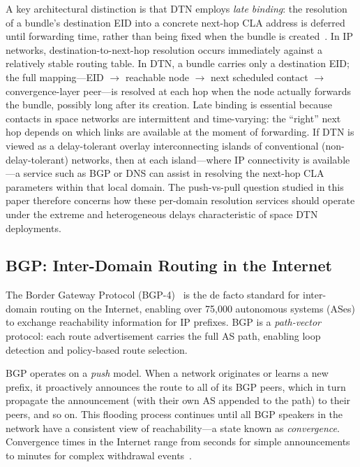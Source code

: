 \documentclass[journal,twocolumn]{IEEEtran}
\begin{document}
A key architectural distinction is that DTN employs \emph{late binding}: the resolution of a bundle's destination EID into a concrete next-hop CLA address is deferred until forwarding time, rather than being fixed when the bundle is created~\cite{fall2003dtn}.
In IP networks, destination-to-next-hop resolution occurs immediately against a relatively stable routing table.
In DTN, a bundle carries only a destination EID; the full mapping---EID $\to$ reachable node $\to$ next scheduled contact $\to$ convergence-layer peer---is resolved at each hop when the node actually forwards the bundle, possibly long after its creation.
Late binding is essential because contacts in space networks are intermittent and time-varying: the ``right'' next hop depends on which links are available at the moment of forwarding.
If DTN is viewed as a delay-tolerant overlay interconnecting islands of conventional (non-delay-tolerant) networks, then at each island---where IP connectivity is available---a service such as BGP or DNS can assist in resolving the next-hop CLA parameters within that local domain.
The push-vs-pull question studied in this paper therefore concerns how these per-domain resolution services should operate under the extreme and heterogeneous delays characteristic of space DTN deployments.

\subsection{BGP: Inter-Domain Routing in the Internet}
\label{sec_bgp_background}

The Border Gateway Protocol (BGP-4)~\cite{rfc4271} is the de facto standard for inter-domain routing on the Internet, enabling over 75{,}000 autonomous systems (ASes) to exchange reachability information for IP prefixes. 
BGP is a \emph{path-vector} protocol: each route advertisement carries the full AS path, enabling loop detection and policy-based route selection.

BGP operates on a \emph{push} model. 
When a network originates or learns a new prefix, it proactively announces the route to all of its BGP peers, which in turn propagate the announcement (with their own AS appended to the path) to their peers, and so on. 
This flooding process continues until all BGP speakers in the network have a consistent view of reachability---a state known as \emph{convergence}. 
Convergence times in the Internet range from seconds for simple announcements to minutes for complex withdrawal events~\cite{labovitz2001delayed}.
\end{document}
